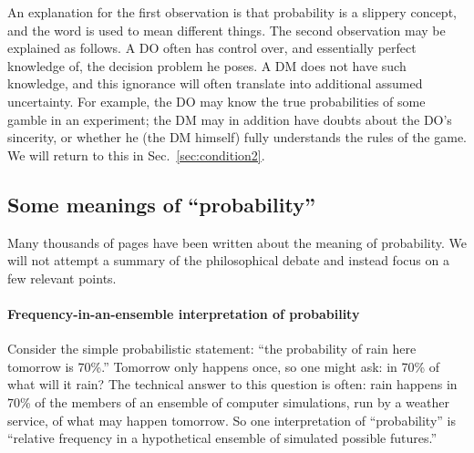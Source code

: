 \documentclass[a4paper, 12pt]{article}
\newcommand{\seclabel}[1]{\label{sec:#1}}
\newcommand{\secref}[1]{Sec.~\ref{sec:#1}}
\newcommand{\ie}{{\it i.e.}\ }
\newcommand{\eg}{{\it e.g.}\ }
\begin{document}
An explanation for the first observation is that probability is a slippery concept, and the word is used to mean different things. 
The second observation may be explained as follows. A DO often has control over, and essentially perfect knowledge of, the decision problem he poses. A DM does not have such knowledge, and this ignorance will often translate into additional assumed uncertainty. For example, the DO may know the true probabilities of some gamble in an experiment; the DM may in addition have doubts about the DO's sincerity, or whether he (the DM himself) fully understands the rules of the game. We will return to this in \secref{condition2}.

\subsection{Some meanings of ``probability'' \seclabel{tricky}}

Many thousands of pages have been written about the meaning of probability. We will not attempt a summary of the philosophical debate and instead focus on a few relevant points.


\paragraph{Frequency-in-an-ensemble interpretation of probability}
Consider the simple probabilistic statement: ``the probability of rain here tomorrow is 70\%.'' Tomorrow only happens once, so one might ask: in 70\% of what will it rain? The technical answer to this question is often: rain happens in 70\% of the members of an ensemble of computer simulations, run by a weather service, of what may happen tomorrow. So one interpretation of ``probability'' is ``relative frequency in a hypothetical ensemble of simulated possible futures.'' 
\end{document}
